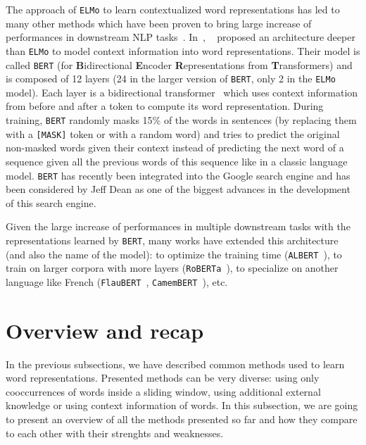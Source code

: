     The approach of \texttt{ELMo} to learn contextualized word representations
    has led to many other methods which have been proven to bring large increase
    of performances in downstream NLP tasks~\citep{devlin2019bert,
    liu2019roberta}. In~\citeyear{devlin2019bert},
    \citeauthor{devlin2019bert}~\citep{devlin2019bert} proposed an architecture
    deeper than \texttt{ELMo} to model context information into word
    representations. Their model is called \texttt{BERT} (for
    \textbf{B}idirectional \textbf{E}ncoder \textbf{R}epresentations from
    \textbf{T}ransformers) and is composed of 12 layers (24 in the larger
    version of \texttt{BERT}, only 2 in the \texttt{ELMo} model). Each layer is
    a bidirectional transformer~\citep{vaswani2017attention} which uses context
    information from before and after a token to compute its word
    representation. During training, \texttt{BERT} randomly masks 15\% of the
    words in sentences (by replacing them with a \texttt{[MASK]} token or with a
    random word) and tries to predict the original non-masked words given their
    context instead of predicting the next word of a sequence given all the
    previous words of this sequence like in a classic language model.
    \texttt{BERT} has recently been integrated into the Google search engine and
    has been considered by Jeff Dean as one of the biggest advances in the
    development of this search engine. \medskip

    Given the large increase of performances in multiple downstream tasks with
    the representations learned by \texttt{BERT}, many works have extended this
    architecture (and also the name of the model): to optimize the training time
    (\texttt{ALBERT}~\citep{lan2019albert}), to train on larger corpora with
    more layers (\texttt{RoBERTa}~\citep{liu2019roberta}), to specialize on
    another language like French (\texttt{FlauBERT}~\citep{le2019flaubert},
    \texttt{CamemBERT}~\citep{martin2019camembert}), etc.

\section{Overview and recap}
  \label{ch03:sec:overview-methods}
  In the previous subsections, we have described common methods used to learn
  word representations. Presented methods can be very diverse: using only
  cooccurrences of words inside a sliding window, using additional external
  knowledge or using context information of words. In this subsection, we are
  going to present an overview of all the methods presented so far and how they
  compare to each other with their strenghts and weaknesses.

